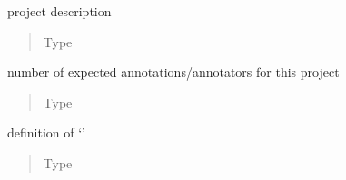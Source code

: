 \documentclass[a4paper,12pt,english]{sphinxmanual}
\begin{document}
\begin{fulllineitems}
\begin{fulllineitems}
\label{\detokenize{project_rst/models:project.models.Project.description}}
project description
\begin{quote}\begin{description}
\item[{Type}] \leavevmode
{}

\end{description}\end{quote}

\end{fulllineitems}


\begin{fulllineitems}
\label{\detokenize{project_rst/models:project.models.Project.anno_number}}
number of expected
annotations/annotators for this project
\begin{quote}\begin{description}
\item[{Type}] \leavevmode
{}

\end{description}\end{quote}

\end{fulllineitems}


\begin{fulllineitems}
\label{\detokenize{project_rst/models:project.models.Project.best_def}}
definition of ‘’
\begin{quote}\begin{description}
\item[{Type}] \leavevmode
{}

\end{description}\end{quote}


\end{fulllineitems}
\end{fulllineitems}
\end{document}
